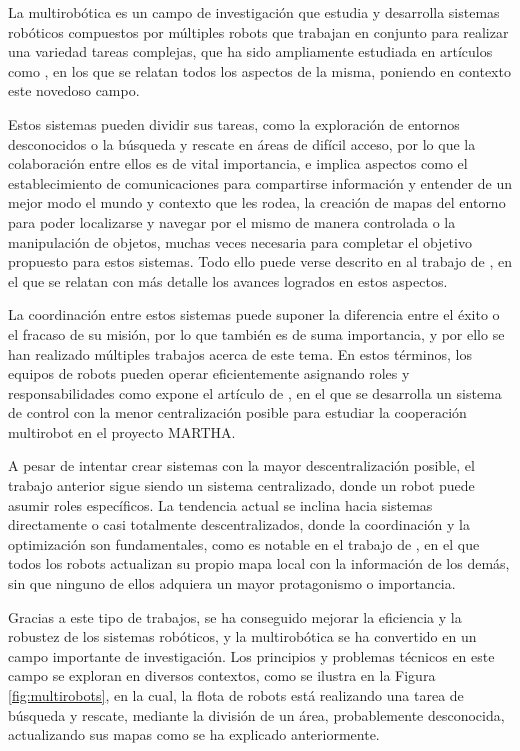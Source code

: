 La multirobótica es un campo de investigación que estudia y desarrolla sistemas
robóticos compuestos por múltiples robots que trabajan en conjunto para realizar
una variedad tareas complejas, que ha sido ampliamente estudiada en artículos
como \cite{Verma2021}, en los que se relatan todos los aspectos de la misma,
poniendo en contexto este novedoso campo.

Estos sistemas pueden dividir sus tareas, como la exploración de entornos
desconocidos o la búsqueda y rescate en áreas de difícil acceso, por lo que la
colaboración entre ellos es de vital importancia, e implica aspectos como el
establecimiento de comunicaciones para compartirse información y entender de un
mejor modo el mundo y contexto que les rodea, la creación de mapas del entorno
para poder localizarse y navegar por el mismo de manera controlada o la
manipulación de objetos, muchas veces necesaria para completar el objetivo
propuesto para estos sistemas.
Todo ello puede verse descrito en al trabajo de \cite{Parker2003}, en el que se
relatan con más detalle los avances logrados en estos aspectos.

La coordinación entre estos sistemas puede suponer la diferencia entre el éxito
o el fracaso de su misión, por lo que también es de suma importancia, y por ello
se han realizado múltiples trabajos acerca de este tema.
En estos términos, los equipos de robots pueden operar eficientemente
asignando roles y responsabilidades como expone el artículo de \cite{Alami1998},
en el que se desarrolla un sistema de control con la menor centralización
posible para estudiar la cooperación multirobot en el proyecto MARTHA.

A pesar de intentar crear sistemas con la mayor descentralización posible, el
trabajo anterior sigue siendo un sistema centralizado, donde un robot puede
asumir roles específicos.
La tendencia actual se inclina hacia sistemas directamente o casi totalmente
descentralizados, donde la coordinación y la optimización son fundamentales,
como es notable en el trabajo de \cite{Sheng2006}, en el que todos los robots
actualizan su propio mapa local con la información de los demás, sin que ninguno
de ellos adquiera un mayor protagonismo o importancia.

Gracias a este tipo de trabajos, se ha conseguido mejorar la eficiencia y la
robustez de los sistemas robóticos, y la multirobótica se ha convertido en un
campo importante de investigación.
Los principios y problemas técnicos en este campo se exploran en diversos
contextos, como se ilustra en la Figura \ref{fig:multirobots}, en la cual, la
flota de robots está realizando una tarea de búsqueda y rescate, mediante la
división de un área, probablemente desconocida, actualizando sus mapas como
se ha explicado anteriormente.

